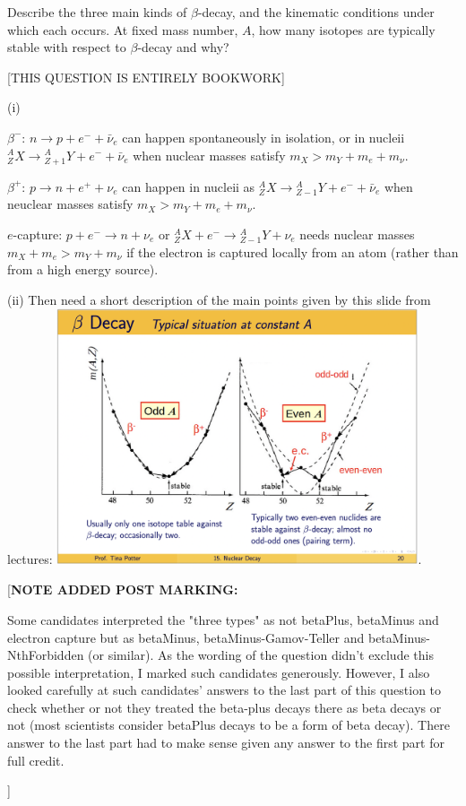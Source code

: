 \documentclass[txfonts]{NSTexam}
\newcommand\ANS[1]{{

\answer %


{\color{blue}
#1
}
 
\endanswer

}}
\newcommand\POSTMARKING[1]{{

{\color{magenta}
[\textbf{NOTE ADDED POST MARKING:}

#1
]
}
}}
\begin{document}
\begin{questions}

\question
Describe the three main kinds of $\beta$-decay, and the kinematic conditions under which each occurs.   At fixed mass number, $A$, how many isotopes are typically stable with respect to $\beta$-decay and why?

\ANS{

 [THIS QUESTION IS ENTIRELY BOOKWORK]
 
 
 (i)
 
 $\beta^-$: $n\rightarrow p+e^-+\bar \nu_e$ can happen spontaneously in isolation, or in nucleii ${}^A_Z X \rightarrow {}^A_{Z+1}Y + e^-+\bar\nu_e$ when nuclear masses satisfy $m_X>m_Y+m_e+m_\nu$.
 
 $\beta^+$: $p\rightarrow n+e^++\nu_e$ can happen in nucleii as ${}^A_Z X \rightarrow {}^A_{Z-1}Y + e^-+\bar\nu_e$ when neuclear masses satisfy $m_X>m_Y+m_e+m_\nu$.
 
 $e$-capture: $p+e^-\rightarrow n+ \nu_e$ or ${}^A_Z X + e^- \rightarrow {}^A_{Z-1}Y +\nu_e$ needs nuclear masses $m_X+m_e>m_Y+m_\nu$ if the electron is captured locally from an atom (rather than from a high energy source).
 
 (ii)
 Then need a short description of the main points given by this slide from lectures:
 \includegraphics[width=0.8\textwidth]{Images/potter_nuclear_slide_20.png}.
 
 \POSTMARKING{Some candidates interpreted the "three types" as not betaPlus, betaMinus and electron capture but as betaMinus, betaMinus-Gamov-Teller and betaMinus-NthForbidden (or similar).  As the wording of the question didn't exclude this possible interpretation, I marked such candidates generously. However, I also looked carefully at such candidates' answers to the last part of this question to check whether or not they treated the beta-plus decays there as beta decays or not (most scientists consider betaPlus decays to be a form of beta decay). There answer to the last part had to make sense given any answer to the first part for full credit.
 
}}
\end{questions}
\end{document}
